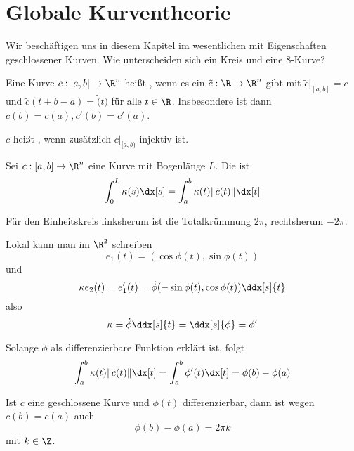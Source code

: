 \chapter{Globale Kurventheorie}



Wir beschäftigen uns in diesem Kapitel im wesentlichen mit Eigenschaften geschlossener Kurven.
Wie unterscheiden sich ein Kreis und eine 8-Kurve?

\begin{df}
	Eine Kurve $c: [a,b] \to \R^n$ heißt , wenn es ein $\tilde c: \R \to \R^n$ gibt mit $\tilde c \big|_{[a,b]} = c$ und $\tilde c(t+b-a) = \tilde (t)$ für alle $t \in \R$.
	Insbesondere ist dann $c(b) = c(a), c'(b) = c'(a)$.

	$c$ heißt , wenn zusätzlich $c|_{[a,b)}$ injektiv ist.
\end{df}

\begin{df}
	Sei $c: [a,b] \to \R^n$ eine Kurve mit Bogenlänge $L$.
	Die  ist
	\[
		\int_0^L \kappa(s) \dx[s]
		= \int_a^b \kappa(t) \|\dot c(t)\| \dx[t]
	\]
\end{df}

\begin{ex}
	Für den Einheitskreis linksherum ist die Totalkrümmung $2\pi$, rechtsherum $-2\pi$.
\end{ex}

Lokal kann man im $\R^2$ schreiben
\[
	e_1(t) = (\cos \phi(t), \sin \phi(t))
\]
und
\[
	\kappa e_2(t)
	= e_1'(t)
	= \dot \phi (-\sin \phi(t), \cos \phi(t)) \ddx[s]{t}
\]
also
\[
	\kappa = \dot \phi \ddx[s]{t} = \ddx[s]{\phi} = \phi'
\]

\begin{kor}
	Solange $\phi$ als differenzierbare Funktion erklärt ist, folgt
	\[
		\int_a^b \kappa(t) \|\dot c(t)\| \dx[t]
		= \int_a^b \phi'(t) \dx[t]
		= \phi(b) - \phi(a)
	\]
\end{kor}

Ist $c$ eine geschlossene Kurve und $\phi(t)$ differenzierbar, dann ist wegen $c(b) = c(a)$ auch
\[
	\phi(b) - \phi(a) = 2\pi k
\]
mit $k \in \Z$.

